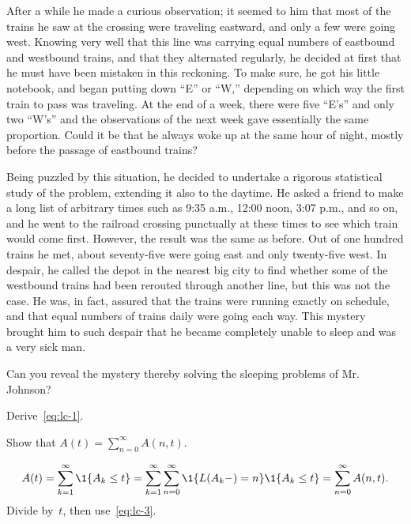 \documentclass[queueing-book.tex]{subfiles}
\begin{document}
After a while he made a curious observation; it seemed to him that most of the trains he saw at the crossing were traveling eastward, and only a few were going west.
Knowing very well that this line was carrying equal numbers of eastbound and westbound trains, and that they alternated regularly, he decided at first that he must have been mistaken in this reckoning.
To make sure, he got his little notebook, and began putting down “E” or “W,” depending on which way the first train to pass was traveling.
At the end of a week, there were five “E’s” and only two “W’s” and the observations of the next week gave essentially the same proportion.
Could it be that he always woke up at the same hour of night, mostly before the passage of eastbound trains?

Being puzzled by this situation, he decided to undertake a rigorous statistical study of the problem, extending it also to the daytime.
He asked a friend to make a long list of arbitrary times such as 9:35 a.m., 12:00 noon, 3:07 p.m., and so on, and he went to the railroad crossing punctually at these times to see which train would come first.
However, the result was the same as before.
Out of one hundred trains he met, about seventy-five were going east and only twenty-five west.
In despair, he called the depot in the nearest big city to find whether some of the westbound trains had been rerouted through another line, but this was not the case.
He was, in fact, assured that the trains were running exactly on schedule, and that equal numbers of trains daily were going each way.
This mystery brought him to such despair that he became completely unable to sleep and was a very sick man.

Can you reveal the mystery thereby solving the sleeping problems of Mr. Johnson?




\begin{exercise}\label{ex:36}
Derive~\cref{eq:lc-1}.
\begin{hint}
 Show that $A(t) =\sum_{n=0}^\infty A(n,t)$.
\end{hint}
\begin{solution}
 \begin{equation*}
A(t) = \sum_{k=1}^\infty \1{A_k \leq t} = \sum_{k=1}^\infty \sum_{n=0}^\infty \1{\L(A_k-) = n} \1{A_k \leq t}  = \sum_{n=0}^\infty A(n,t).
 \end{equation*}
Divide by~$t$, then use~\cref{eq:lc-3}.
\end{solution}
\end{exercise}
\end{document}
